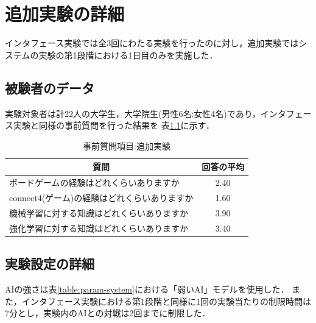 \chapter{追加実験の詳細}
\label{chap:system}
インタフェース実験では全3回にわたる実験を行ったのに対し，追加実験ではシステムの実験の第1段階における1日目のみを実施した．
\section{被験者のデータ}
実験対象者は計22人の大学生，大学院生(男性6名:女性4名)であり，インタフェース実験と同様の事前質問を行った結果を
表\ref{table:before-extra}に示す．


\begin{table}[H]
    \caption{事前質問項目:追加実験}
    \label{table:before-extra}
    \centering
	\scriptsize
    \begin{tabular}{l||c}
        \multicolumn{1}{c|}{質問} & 回答の平均\\ \hline \hline
        ボードゲームの経験はどれくらいありますか & 2.40\\
        connect4(ゲーム)の経験はどれくらいありますか& 1.60\\\hline
        機械学習に対する知識はどれくらいありますか& 3.90\\
        強化学習に対する知識はどれくらいありますか& 3.40\\
    \end{tabular}
    
\end{table}
\section{実験設定の詳細}
AIの強さは表\ref{table:param-system}における「弱いAI」モデルを使用した．
また，インタフェース実験における第1段階と同様に1回の実験当たりの制限時間は7分とし，実験内のAIとの対戦は2回までに制限した．

